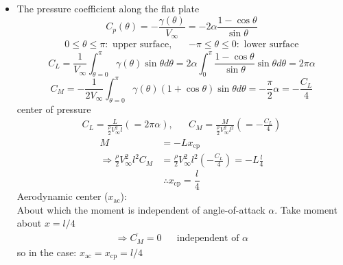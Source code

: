 \begin{itemize}
\begin{equation}
\end{equation}
As before, can get $\gamma(\theta)=\gamma_2(\theta)+\gamma_h(\theta)$ <cf> \eqref{eq: 6-2-43}
\label{eq: 6-2-65}
\begin{equation}
\Longrightarrow
\gamma(\theta) = \underbrace{\frac{K}{\sin\theta}}_{\gamma_h(\theta)} - \underbrace{2V_\infty\alpha\frac{\cos\theta}{\sin\theta}}_{\gamma_2(\theta)}
\label{eq: 6-2-66}
\end{equation}
To satisfy $\gamma(\theta=0)=0\Longrightarrow K = 2V_\infty\alpha$, i.e.
\begin{equation}
\gamma(\theta) = 2V_\infty\alpha\frac{1-\cos\theta}{\sin\theta}
\label{eq: 6-2-67}
\end{equation}
\item The pressure coefficient along the flat plate 
\begin{equation}
C_p(\theta) = -\frac{\gamma(\theta)}{V_\infty} = -2\alpha\frac{1-\cos\theta}{\sin\theta}
\label{eq: 6-2-68}
\end{equation}
\begin{align*}
0\leq \theta\leq \pi\colon\text{ upper surface},&& -\pi\leq \theta\leq 0\colon\text{ lower surface}
\end{align*}
\begin{equation}
C_L = \frac{1}{V_\infty}\int_{\theta=0}^\pi\gamma(\theta)\sin\theta d\theta = 2\alpha\int_0^\pi\frac{1-\cos\theta}{\sin\theta}\sin\theta d\theta = 2\pi\alpha
\label{eq: 6-2-69}
\end{equation}
\begin{equation}
C_M = -\frac{1}{2V_\infty}\int_{\theta=0}^\pi\gamma(\theta)\left(1+\cos\theta\right)\sin\theta d\theta = -\frac{\pi}{2}\alpha = -\frac{C_L}{4}
\label{eq: 6-2-70}
\end{equation}
center of pressure
\begin{align*}
C_L = \frac{L}{\frac{\rho}{2}V_\infty^2 l}(=2\pi\alpha), &&C_M = \frac{M}{\frac{\rho}{2}V_\infty^2 l^2}(=-\frac{C_L}{4})
\end{align*}
\begin{align*}
M &= -Lx_{\text{cp}} \\
\Longrightarrow
\frac{\rho}{2}V_\infty^2l^2C_M &= \frac{\rho}{2}V_\infty^2l^2\left(-\frac{C_L}{4}\right) = -L\frac{l}{4}
\end{align*}
\begin{equation}
\therefore\boxed{x_{\text{cp}} = \frac{l}{4}}
\label{eq: 6-2-71}
\end{equation}
Aerodynamic center ($x_\text{ac}$):\\
About which the moment is independent of angle-of-attack $\alpha$. Take moment about $x=l/4$
\begin{align}
\Longrightarrow\overline{C_M} = 0&&\text{independent of }\alpha
\label{eq: 6-2-72}
\end{align}
so in the case: $x_\text{ac} = x_\text{cp} = l/4$
\end{itemize}
